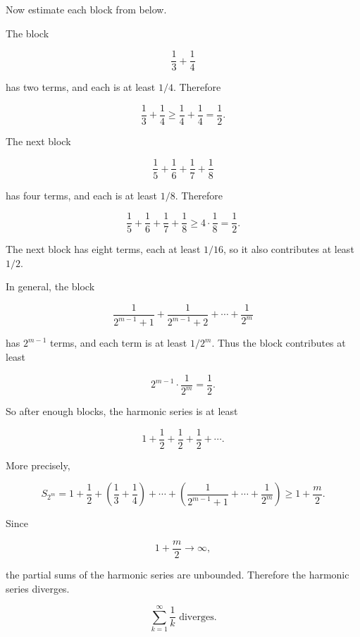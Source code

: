 Now estimate each block from below.

The block

\[
\frac13+\frac14
\]

has two terms, and each is at least \(1/4\).  Therefore

\[
\frac13+\frac14\ge \frac14+\frac14=\frac12.
\]

The next block

\[
\frac15+\frac16+\frac17+\frac18
\]

has four terms, and each is at least \(1/8\).  Therefore

\[
\frac15+\frac16+\frac17+\frac18
\ge
4\cdot\frac18
=
\frac12.
\]

The next block has eight terms, each at least \(1/16\), so it also contributes at least
\(1/2\).

In general, the block

\[
\frac1{2^{m-1}+1}+\frac1{2^{m-1}+2}+\cdots+\frac1{2^m}
\]

has \(2^{m-1}\) terms, and each term is at least \(1/2^m\).  Thus the block contributes
at least

\[
2^{m-1}\cdot\frac1{2^m}=\frac12.
\]

So after enough blocks, the harmonic series is at least

\[
1+\frac12+\frac12+\frac12+\cdots.
\]

More precisely,

\[
S_{2^m}
=
1+\frac12+\left(\frac13+\frac14\right)+\cdots+
\left(\frac1{2^{m-1}+1}+\cdots+\frac1{2^m}\right)
\ge
1+\frac{m}{2}.
\]

Since

\[
1+\frac{m}{2}\to\infty,
\]

the partial sums of the harmonic series are unbounded.  Therefore the harmonic series
diverges.

\[
\boxed{
\sum_{k=1}^{\infty}\frac1k \text{ diverges.}
}
\]

